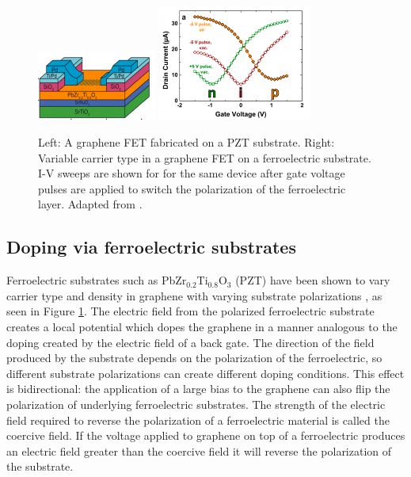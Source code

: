 \documentclass[edeposit,fullpage,draftthesis]{uiucthesis2009}
\begin{document}
            \begin{figure}
            \centering
            \includegraphics[width=0.35\textwidth]{images/background/ChristophDevice.png}
            \includegraphics[width=0.45\textwidth]{images/background/ChristophFig4.png}
            \caption[Graphene on ferroelectric substrates]{Left: A graphene FET fabricated on a PZT substrate. Right: Variable carrier type in a graphene FET on a ferroelectric substrate. I-V sweeps are shown for for the same device after gate voltage pulses are applied to switch the polarization of the ferroelectric layer. Adapted from \cite{Baeumer2013}.}
            \label{fig:GonPZT}
            \end{figure}
        
    \subsection{Doping via ferroelectric substrates}
    
        Ferroelectric substrates such as 
        PbZr$_{0.2}$Ti$_{0.8}$O$_3$ (PZT) have been shown to vary carrier type and density in 
        graphene with varying substrate polarizations \cite{Baeumer2013}, as seen in Figure 
        \ref{fig:GonPZT}. The electric field from the polarized ferroelectric substrate creates a local potential
        which dopes the graphene in a manner analogous to the doping created by the electric field of a back gate.
        The direction of the field produced by the substrate depends on the polarization of the ferroelectric,
        so different substrate polarizations can create different doping conditions.
        This effect is bidirectional: the application of a large bias to the graphene 
        can also flip the polarization of underlying ferroelectric substrates. The strength of the 
        electric field required to reverse the polarization of a ferroelectric material is called
        the coercive field. If the voltage applied to graphene on top of a ferroelectric produces
        an electric field greater than the coercive field it will reverse the polarization of the substrate.
        
\end{document}

